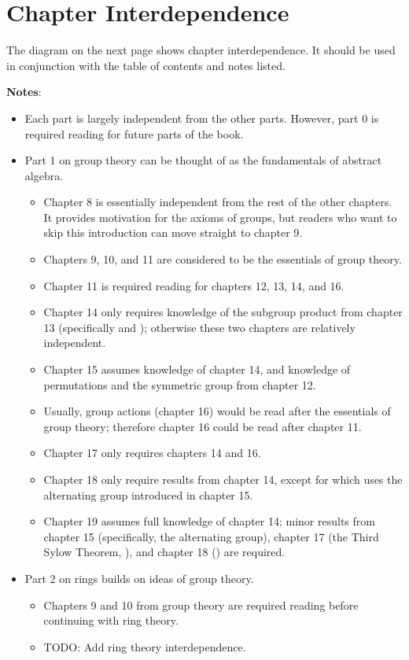 \section*{Chapter Interdependence}
The diagram on the next page shows chapter interdependence. It should be used in conjunction with the table of contents and notes listed.

\newpage
\begin{center}
\end{center}

\newpage

\textbf{Notes}:
\begin{itemize}
    \item Each part is largely independent from the other parts. However, part 0 is required reading for future parts of the book.
    \item Part 1 on group theory can be thought of as the fundamentals of abstract algebra.
    \begin{itemize}
        \item Chapter 8 is essentially independent from the rest of the other chapters. It provides motivation for the axioms of groups, but readers who want to skip this introduction can move straight to chapter 9.
        \item Chapters 9, 10, and 11 are considered to be the essentials of group theory.
        \item Chapter 11 is required reading for chapters 12, 13, 14, and 16.
        \item Chapter 14 only requires knowledge of the subgroup product from chapter 13 (specifically  and ); otherwise these two chapters are relatively independent.
        \item Chapter 15 assumes knowledge of chapter 14, and knowledge of permutations and the symmetric group from chapter 12.
        \item Usually, group actions (chapter 16) would be read after the essentials of group theory; therefore chapter 16 could be read after chapter 11.
        \item Chapter 17 only requires chapters 14 and 16.
        \item Chapter 18 only require results from chapter 14, except for  which uses the alternating group introduced in chapter 15.
        \item Chapter 19 assumes full knowledge of chapter 14; minor results from chapter 15 (specifically, the alternating group), chapter 17 (the Third Sylow Theorem, ), and chapter 18 () are required.
    \end{itemize}
    \item Part 2 on rings builds on ideas of group theory.
    \begin{itemize}
        \item Chapters 9 and 10 from group theory are required reading before continuing with ring theory.
        \item TODO: Add ring theory interdependence.
    \end{itemize}
\end{itemize}
